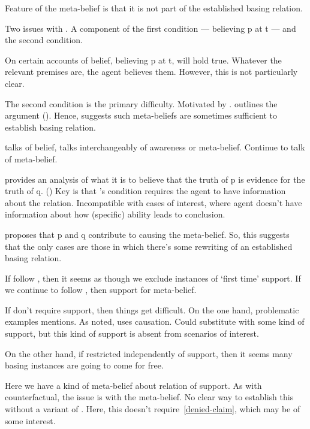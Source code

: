 \begin{note}[Doxastic]
    Feature of the meta-belief is that it is not part of the established basing relation.

    Two issues with \citeauthor{Tolliver:1982us}.
    A component of the first condition --- believing p at t --- and the second condition.

    On certain accounts of belief, believing p at t, will hold true.
    Whatever the relevant premises are, the agent believes them.
    However, this is not particularly clear.

    The second condition is the primary difficulty.
    Motivated by \citeauthor{Lehrer:1971aa}.
    \cite{Korcz:2000uo} outlines the argument (\citeyear[534]{Korcz:2000uo}).
    Hence, suggests such meta-beliefs are sometimes sufficient to establish basing relation.

    \citeauthor{Tolliver:1982us} talks of belief, \citeauthor{Korcz:2000uo} talks interchangeably of awareness or meta-belief.
    Continue to talk of meta-belief.

    \citeauthor{Tolliver:1982us} provides an analysis of what it is to believe that the truth of p is evidence for the truth of q. (\citeyear[156--157]{Tolliver:1982us})
    Key is that \citeauthor{Tolliver:1982us}'s condition requires the agent to have information about the relation.
    Incompatible with cases of interest, where agent doesn't have information about how (specific) ability leads to conclusion.

    \citeauthor{Korcz:2000uo} proposes that p and q contribute to causing the meta-belief.
    So, this suggests that the only cases are those in which there's some rewriting of an established basing relation.

    If follow \citeauthor{Korcz:2000uo}, then it seems as though we exclude instances of `first time' support.
    If we continue to follow \citeauthor{Tolliver:1982us}, then support for meta-belief.

    If don't require support, then things get difficult.
    On the one hand, problematic examples \citeauthor{Korcz:2000uo} mentions.
    As noted, \citeauthor{Korcz:2000uo} uses causation.
    Could substitute with some kind of support, but this kind of support is absent from scenarios of interest.

    On the other hand, if restricted independently of support, then it seems many basing instances are going to come for free.


  Here we have a kind of meta-belief about relation of support.
  As with counterfactual, the issue is with the meta-belief.
  No clear way to establish this without a variant of \AR{}.
  Here, this doesn't require~\ref{denied-claim}, which may be of some interest.


\end{note}
